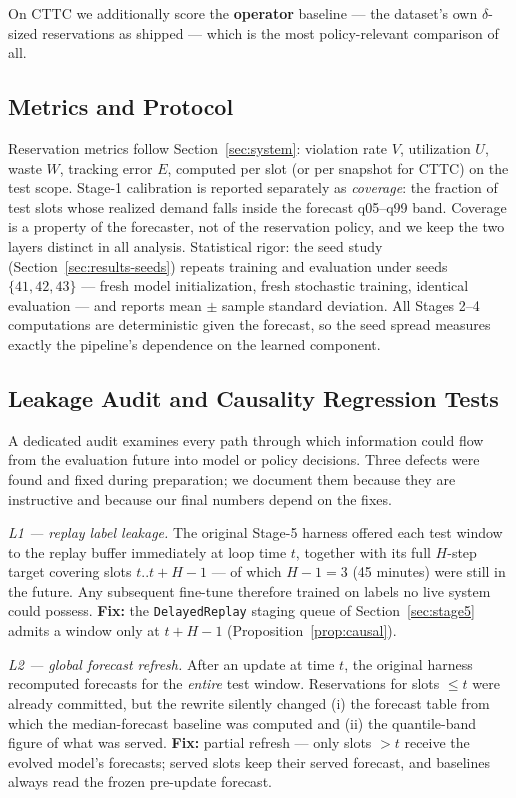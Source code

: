 On CTTC we additionally score the \textbf{operator} baseline --- the
dataset's own $\delta$-sized reservations as shipped --- which is the
most policy-relevant comparison of all.

\subsection{Metrics and Protocol}

Reservation metrics follow Section~\ref{sec:system}: violation rate
$V$, utilization $U$, waste $W$, tracking error $E$, computed per
slot (or per snapshot for CTTC) on the test scope. Stage-1
calibration is reported separately as \emph{coverage}: the fraction
of test slots whose realized demand falls inside the forecast
q05--q99 band. Coverage is a property of the forecaster, not of the
reservation policy, and we keep the two layers distinct in all
analysis. Statistical rigor: the seed study
(Section~\ref{sec:results-seeds}) repeats training and evaluation
under seeds $\{41, 42, 43\}$ --- fresh model initialization, fresh
stochastic training, identical evaluation --- and reports mean $\pm$
sample standard deviation. All Stages 2--4 computations are
deterministic given the forecast, so the seed spread measures
exactly the pipeline's dependence on the learned component.

\subsection{Leakage Audit and Causality Regression Tests}
\label{sec:leakage-audit}

A dedicated audit examines every path through which information could
flow from the evaluation future into model or policy decisions. Three
defects were found and fixed during preparation; we document them
because they are instructive and because our final numbers depend on
the fixes.

\emph{L1 --- replay label leakage.} The original Stage-5 harness
offered each test window to the replay buffer immediately at loop
time $t$, together with its full $H$-step target covering slots
$t..t{+}H{-}1$ --- of which $H{-}1 = 3$ (45 minutes) were still in
the future. Any subsequent fine-tune therefore trained on labels no
live system could possess. \textbf{Fix:} the \texttt{DelayedReplay}
staging queue of Section~\ref{sec:stage5} admits a window only at
$t{+}H{-}1$ (Proposition~\ref{prop:causal}).

\emph{L2 --- global forecast refresh.} After an update at time $t$,
the original harness recomputed forecasts for the \emph{entire} test
window. Reservations for slots $\le t$ were already committed, but
the rewrite silently changed (i) the forecast table from which the
median-forecast baseline was computed and (ii) the quantile-band
figure of what was served. \textbf{Fix:} partial refresh ---
only slots $> t$ receive the evolved model's forecasts; served slots
keep their served forecast, and baselines always read the frozen
pre-update forecast.

